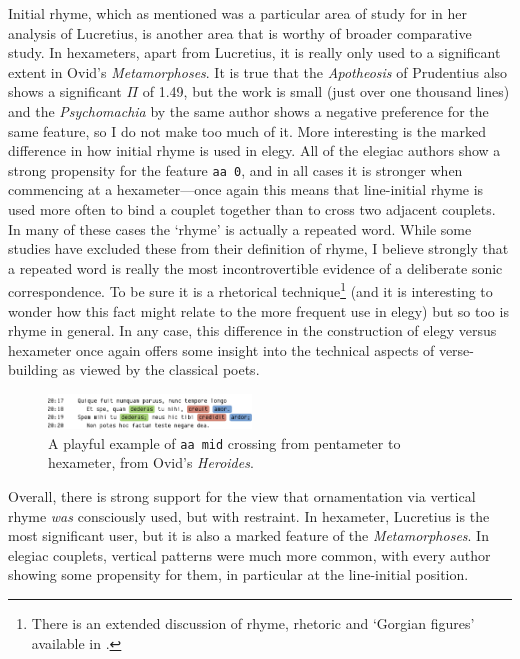 \documentclass[twocolumn, switch]{article} %
\begin{document}
Initial rhyme, which as mentioned was a particular area of study for
\citeauthor{deutsch_1978} in her analysis of Lucretius, is another area that
is worthy of broader comparative study. In hexameters, apart from Lucretius,
it is really only used to a significant extent in Ovid's \emph{Metamorphoses}.
It is true that the \emph{Apotheosis} of Prudentius also shows a significant
$\Pi$ of 1.49, but the work is small (just over one thousand lines) and the
\emph{Psychomachia} by the same author shows a negative preference for the
same feature, so I do not make too much of it. More interesting is the marked
difference in how initial rhyme is used in elegy. All of the elegiac authors
show a strong propensity for the feature \texttt{aa 0}, and in all cases it is
stronger when commencing at a hexameter---once again this means that
line-initial rhyme is used more often to bind a couplet together than to cross
two adjacent couplets. In many of these cases the `rhyme' is actually a
repeated word. While some studies have excluded these from their definition of
rhyme, I believe strongly that a repeated word is really the most
incontrovertible evidence of a deliberate sonic correspondence. To be sure it
is a rhetorical technique\footnote{
  There is an extended discussion of rhyme, rhetoric and `Gorgian figures'
  available in .
}
(and it is interesting to wonder how this fact might relate to the more
frequent use in elegy) but so too is rhyme in general. In any case, this
difference in the construction of elegy versus hexameter once again offers
some insight into the technical aspects of verse-building as viewed by the
classical poets.

\begin{figure}
    \caption{
      A playful example of \texttt{aa mid} crossing from pentameter to
      hexameter, from Ovid's \emph{Heroides}.
    }
    \label{fig:heroides_pent}
    \centering
    \includegraphics[width=0.48\textwidth]{heroides_pent.pdf}
\end{figure}

Overall, there is strong support for the view that ornamentation via vertical
rhyme \emph{was} consciously used, but with restraint. In hexameter, Lucretius
is the most significant user, but it is also a marked feature of the
\emph{Metamorphoses}. In elegiac couplets, vertical patterns were much more
common, with every author showing some propensity for them, in particular at
the line-initial position. 
\end{document}

